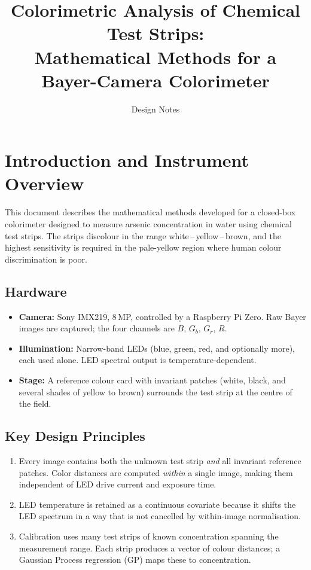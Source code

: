 \documentclass[11pt, a4paper]{article}
\title{%
  Colorimetric Analysis of Chemical Test Strips:\\
  Mathematical Methods for a Bayer-Camera Colorimeter}
\author{Design Notes}
\date{}
\begin{document}
\maketitle
\tableofcontents
\newpage

\section{Introduction and Instrument Overview}

This document describes the mathematical methods developed for a
closed-box colorimeter designed to measure arsenic concentration in
water using chemical test strips.  The strips discolour in the range
white\,--\,yellow\,--\,brown, and the highest sensitivity is required
in the pale-yellow region where human colour discrimination is poor.

\subsection{Hardware}

\begin{itemize}[nosep]
  \item \textbf{Camera:} Sony IMX219, 8\,MP, controlled by a Raspberry Pi Zero.
    Raw Bayer images are captured; the four channels are
    $B$, $G_b$, $G_r$, $R$.
  \item \textbf{Illumination:} Narrow-band LEDs (blue, green, red, and
    optionally more), each used alone.  LED spectral output is
    temperature-dependent.
  \item \textbf{Stage:} A reference colour card with invariant patches
    (white, black, and several shades of yellow to brown) surrounds the
    test strip at the centre of the field.
\end{itemize}

\subsection{Key Design Principles}

\begin{enumerate}[nosep]
  \item Every image contains both the unknown test strip \emph{and} all
    invariant reference patches.  Color distances are computed
    \emph{within} a single image, making them independent of LED
    drive current and exposure time.
  \item LED temperature is retained as a continuous covariate because
    it shifts the LED spectrum in a way that is not cancelled by
    within-image normalisation.
  \item Calibration uses many test strips of known concentration spanning
    the measurement range.  Each strip produces a vector of colour
    distances; a Gaussian Process regression (GP) maps these to concentration.
\end{enumerate}
\end{document}
